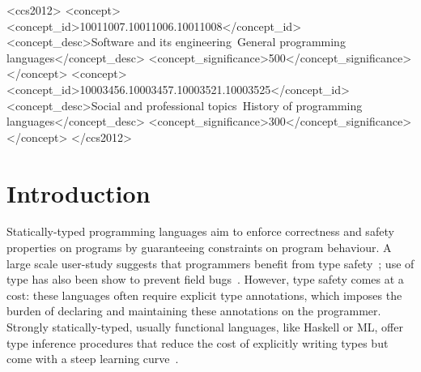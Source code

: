 \documentclass[sigplan,10pt,review,anonymous]{acmart} %
\theoremstyle{plain}
\theoremstyle{remark}
\theoremstyle{definition}
\begin{document}
\begin{CCSXML}
	<ccs2012>
	<concept>
	<concept_id>10011007.10011006.10011008</concept_id>
	<concept_desc>Software and its engineering~General programming languages</concept_desc>
	<concept_significance>500</concept_significance>
	</concept>
	<concept>
	<concept_id>10003456.10003457.10003521.10003525</concept_id>
	<concept_desc>Social and professional topics~History of programming languages</concept_desc>
	<concept_significance>300</concept_significance>
	</concept>
	</ccs2012>
\end{CCSXML}




\maketitle

\section{Introduction}

Statically-typed programming languages aim to enforce correctness and safety  properties
on programs by guaranteeing constraints on program behaviour.
A large scale user-study
suggests that programmers
benefit from type safety~\citep{hanenberg14}; use of type has also been
show to prevent field bugs~\citep{gao17}.
However, type safety comes at a cost: these languages often require explicit type annotations,
which imposes the burden of declaring and maintaining these annotations on the programmer.
Strongly statically-typed, usually functional languages, like Haskell or ML,
offer type inference procedures that reduce
the cost of explicitly writing types but come with
a steep learning curve~\citep{wadler98,tirronen15}.
\end{document}
